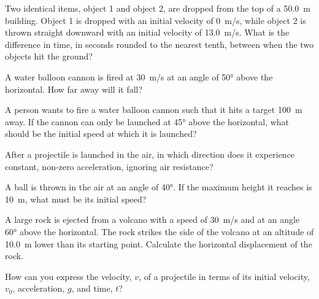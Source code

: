 \documentclass[main.tex]{subfiles}
\begin{document}
\begin{exercise}  \label{agp59Z}
    Two identical items, object 1 and object 2, are dropped from the top of a \SI{50.0}{m} building. Object 1 is dropped with an initial velocity of \SI{0}{m/s}, while object 2 is thrown straight downward with an initial velocity of \SI{13.0}{m/s}. What is the difference in time, in seconds rounded to the nearest tenth, between when the two objects hit the ground?
\end{exercise}

\begin{exercise} \label{Xu3FK9}
    A water balloon cannon is fired at \SI{30}{m/s} at an angle of \ang{50} above the horizontal. How far away will it fall?
\end{exercise}

\begin{exercise} \label{piJ9kJ}
    A person wants to fire a water balloon cannon such that it hits a target \SI{100}{m} away. If the cannon can only be launched at \ang{45} above the horizontal, what should be the initial speed at which it is launched?
\end{exercise}

\begin{exercise} \label{sy5RGT}
    After a projectile is launched in the air, in which direction does it experience constant, non-zero acceleration, ignoring air resistance?
\end{exercise}

\begin{exercise} \label{N0Bwou}
    A ball is thrown in the air at an angle of \ang{40}. If the maximum height it reaches is \SI{10}{m}, what must be its initial speed?
\end{exercise}

\begin{exercise} \label{lhjg95}
    A large rock is ejected from a volcano with a speed of \SI{30}{m/s} and at an angle \ang{60} above the horizontal. The rock strikes the side of the volcano at an altitude of \SI{10.0}{m} lower than its starting point. Calculate the horizontal displacement of the rock.
\end{exercise}

\begin{exercise} \label{wlbvvu}
    How can you express the velocity, $v$, of a projectile in terms of its initial velocity, $v_0$, acceleration, $g$, and time, $t$?
\end{exercise}

\end{document}
